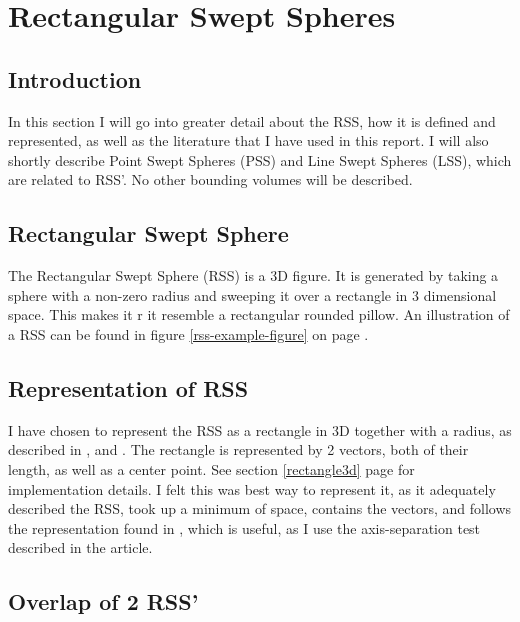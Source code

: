 
\section{Rectangular Swept Spheres}
\label{rss}

\subsection{Introduction}
In this section I will go into greater detail about the RSS, how it is defined and represented, as well as the literature that I have used in this report. I will also shortly describe Point Swept Spheres (PSS) and Line Swept Spheres (LSS), which are related to RSS'. No other bounding volumes will be described. 

\subsection{Rectangular Swept Sphere}
The Rectangular Swept Sphere (RSS) is a 3D figure. It is generated by taking a sphere with a non-zero radius and sweeping it over a rectangle in 3 dimensional space. This makes it r it resemble a rectangular rounded pillow. An illustration of a RSS can be found in figure \ref{rss-example-figure} on page \pageref{rss-example-figure}. 

\subsection{Representation of RSS}
I have chosen to represent the RSS as a rectangle in 3D together with a radius, as described in \cite{larsen00fast}, \cite{Larsen99fastproximity} and \cite{237244}. The rectangle is represented by 2 vectors, both of their length, as well as a center point. See section \ref{rectangle3d} page \pageref{rectangle3d} for  implementation details. I felt this was best way to represent it, as it adequately described the RSS, took up a minimum of space, contains the vectors, and follows the representation found in \cite{237244}, which is useful, as I use the axis-separation test described in the article.

\subsection{Overlap of 2 RSS'}

